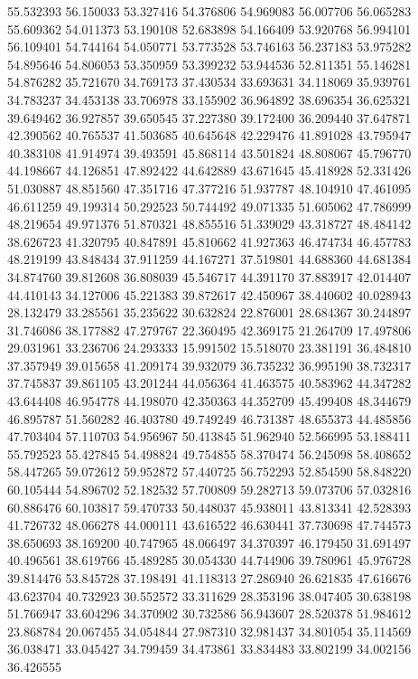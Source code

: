 55.532393
56.150033
53.327416
54.376806
54.969083
56.007706
56.065283
55.609362
54.011373
53.190108
52.683898
54.166409
53.920768
56.994101
56.109401
54.744164
54.050771
53.773528
53.746163
56.237183
53.975282
54.895646
54.806053
53.350959
53.399232
53.944536
52.811351
55.146281
54.876282
35.721670
34.769173
37.430534
33.693631
34.118069
35.939761
34.783237
34.453138
33.706978
33.155902
36.964892
38.696354
36.625321
39.649462
36.927857
39.650545
37.227380
39.172400
36.209440
37.647871
42.390562
40.765537
41.503685
40.645648
42.229476
41.891028
43.795947
40.383108
41.914974
39.493591
45.868114
43.501824
48.808067
45.796770
44.198667
44.126851
47.892422
44.642889
43.671645
45.418928
52.331426
51.030887
48.851560
47.351716
47.377216
51.937787
48.104910
47.461095
46.611259
49.199314
50.292523
50.744492
49.071335
51.605062
47.786999
48.219654
49.971376
51.870321
48.855516
51.339029
43.318727
48.484142
38.626723
41.320795
40.847891
45.810662
41.927363
46.474734
46.457783
48.219199
43.848434
37.911259
44.167271
37.519801
44.688360
44.681384
34.874760
39.812608
36.808039
45.546717
44.391170
37.883917
42.014407
44.410143
34.127006
45.221383
39.872617
42.450967
38.440602
40.028943
28.132479
33.285561
35.235622
30.632824
22.876001
28.684367
30.244897
31.746086
38.177882
47.279767
22.360495
42.369175
21.264709
17.497806
29.031961
33.236706
24.293333
15.991502
15.518070
23.381191
36.484810
37.357949
39.015658
41.209174
39.932079
36.735232
36.995190
38.732317
37.745837
39.861105
43.201244
44.056364
41.463575
40.583962
44.347282
43.644408
46.954778
44.198070
42.350363
44.352709
45.499408
48.344679
46.895787
51.560282
46.403780
49.749249
46.731387
48.655373
44.485856
47.703404
57.110703
54.956967
50.413845
51.962940
52.566995
53.188411
55.792523
55.427845
54.498824
49.754855
58.370474
56.245098
58.408652
58.447265
59.072612
59.952872
57.440725
56.752293
52.854590
58.848220
60.105444
54.896702
52.182532
57.700809
59.282713
59.073706
57.032816
60.886476
60.103817
59.470733
50.448037
45.938011
43.813341
42.528393
41.726732
48.066278
44.000111
43.616522
46.630441
37.730698
47.744573
38.650693
38.169200
40.747965
48.066497
34.370397
46.179450
31.691497
40.496561
38.619766
45.489285
30.054330
44.744906
39.780961
45.976728
39.814476
53.845728
37.198491
41.118313
27.286940
26.621835
47.616676
43.623704
40.732923
30.552572
33.311629
28.353196
38.047405
30.638198
51.766947
33.604296
34.370902
30.732586
56.943607
28.520378
51.984612
23.868784
20.067455
34.054844
27.987310
32.981437
34.801054
35.114569
36.038471
33.045427
34.799459
34.473861
33.834483
33.802199
34.002156
36.426555
